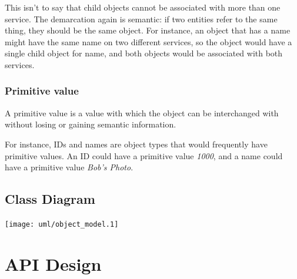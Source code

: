 \documentclass{report}
\begin{document}
			This isn't to say that child objects cannot be associated with more 
			than one service. The demarcation again is semantic: if two 
			entities refer to the same thing, they should be the same object.
			For instance, an object that has a name might have the same name on 
			two different services, so the object would have a single child 
			object for name, and both objects would be associated with both 
			services.

		\subsubsection{Primitive value} 

			A primitive value is a value with which the object can be 
			interchanged with without losing or gaining semantic information.

			For instance, IDs and names are object types that would frequently 
			have primitive values. An ID could have a primitive value 
			\emph{1000}, and a name could have a primitive value \emph{Bob's 
			  Photo}.
		\subsection{Class Diagram}
			\texttt{[image: uml/object\_model.1]}


	
	\section{API Design}
\end{document}
